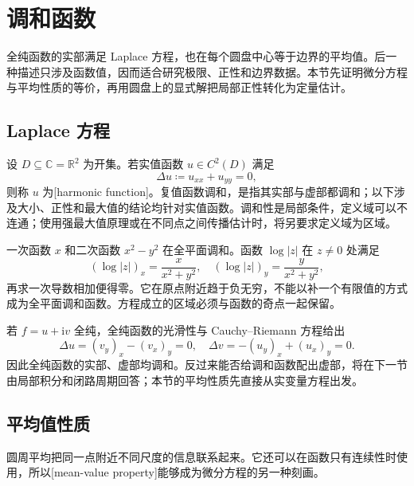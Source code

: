 \section{调和函数}
\label{b3:sec:1501}

全纯函数的实部满足 Laplace 方程，也在每个圆盘中心等于边界的平均值。后一种描述只涉及函数值，因而适合研究极限、正性和边界数据。本节先证明微分方程与平均性质的等价，再用圆盘上的显式解把局部正性转化为定量估计。

\subsection{Laplace 方程}
\label{b3:subsec:150101}

设 \(D\subseteq\mathbb C=\mathbb R^2\) 为开集。若实值函数 \(u\in C^2(D)\) 满足
\[
 \Delta u\coloneqq u_{xx}+u_{yy}=0,
\]
则称 \(u\) 为[harmonic function]。复值函数调和，是指其实部与虚部都调和；以下涉及大小、正性和最大值的结论均针对实值函数。调和性是局部条件，定义域可以不连通；使用强最大值原理或在不同点之间传播估计时，将另要求定义域为区域。

\ProseParagraphBreak
一次函数 \(x\) 和二次函数 \(x^2-y^2\) 在全平面调和。函数 \(\log|z|\) 在 \(z\ne0\) 处满足
\[
 (\log|z|)_x=\frac{x}{x^2+y^2},
 \quad (\log|z|)_y=\frac{y}{x^2+y^2},
\]
再求一次导数相加便得零。它在原点附近趋于负无穷，不能以补一个有限值的方式成为全平面调和函数。方程成立的区域必须与函数的奇点一起保留。

\ProseParagraphBreak
若 \(f=u+\mathrm i v\) 全纯，全纯函数的光滑性与 Cauchy--Riemann 方程给出
\[
 \Delta u=(v_y)_x-(v_x)_y=0,
 \quad
 \Delta v=-(u_y)_x+(u_x)_y=0.
\]
因此全纯函数的实部、虚部均调和。反过来能否给调和函数配出虚部，将在下一节由局部积分和闭路周期回答；本节的平均性质先直接从实变量方程出发。

\subsection{平均值性质}
\label{b3:subsec:150102}

圆周平均把同一点附近不同尺度的信息联系起来。它还可以在函数只有连续性时使用，所以[mean-value property]能够成为微分方程的另一种刻画。

